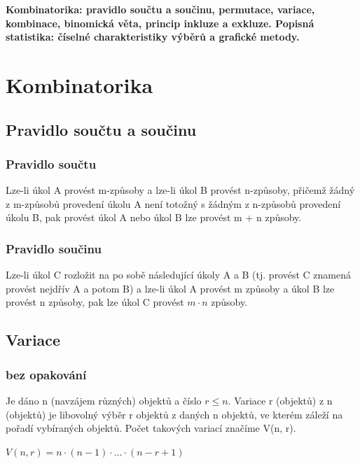 \newpage
\textbf{Kombinatorika: pravidlo součtu a součinu, permutace, variace, kombinace, binomická věta, princip inkluze a
exkluze. Popisná statistika: číselné charakteristiky výběrů a grafické metody.}

\section{Kombinatorika}
\subsection{Pravidlo součtu a součinu}
\subsubsection{Pravidlo součtu}
\begin{definition}
	Lze-li úkol A provést m-způsoby a lze-li úkol B provést n-způsoby,
přičemž žádný z m-způsobů provedení úkolu A není totožný s žádným z n-způsobů
provedení úkolu B, pak provést úkol A nebo úkol B lze provést m + n způsoby.
\end{definition}

\subsubsection{Pravidlo součinu}
\begin{definition}
	Lze-li úkol C rozložit na po sobě následující úkoly A a B (tj. provést
C znamená provést nejdřív A a potom B) a lze-li úkol A provést m způsoby a úkol B lze
provést n způsoby, pak lze úkol C provést $m \cdot n $ způsoby.	
\end{definition}

\subsection{Variace}
\subsubsection{bez opakování}
\begin{definition}
	Je dáno n (navzájem různých) objektů a číslo $r \leq n$. Variace r
(objektů) z n (objektů) je libovolný výběr r objektů z daných n objektů, ve kterém záleží na
pořadí vybíraných objektů. Počet takových variací značíme V(n, r).
\end{definition}
\begin{sentence}
	$V(n, r) = n \cdot (n - 1) \cdot \dots \cdot (n - r + 1)$
\end{sentence}
